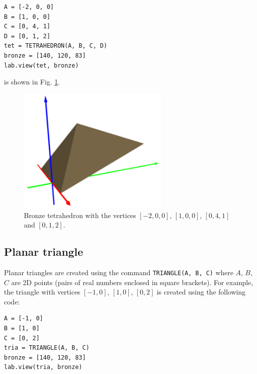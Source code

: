 \begin{bbox}
\begin{verbatim}
A = [-2, 0, 0] 
B = [1, 0, 0] 
C = [0, 4, 1] 
D = [0, 1, 2]
tet = TETRAHEDRON(A, B, C, D)
bronze = [140, 120, 83]
lab.view(tet, bronze)
\end{verbatim}
\end{bbox}
\vspace{6mm}

\noindent
is shown in Fig. \ref{fig:chull}.

\begin{figure}[!ht]
\begin{center}
\includegraphics[width=0.65\textwidth]{img/chull1.png}
\end{center}
\vspace{-2mm}
\caption{Bronze tetrahedron with the vertices $[-2, 0, 0]$, $[1, 0, 0]$, $[0, 4, 1]$ and $[0, 1, 2]$.}
\label{fig:chull}
\end{figure}
\noindent

\subsection{Planar triangle}

Planar triangles are created using the command {\tt TRIANGLE(A, B, C)} where 
$A$, $B$, $C$ are 2D points (pairs of real numbers enclosed in square brackets).
For example, the triangle with vertices $[-1, 0]$, $[1, 0]$, $[0, 2]$ is 
created using the following code:\\

\begin{bbox}
\begin{verbatim}
A = [-1, 0] 
B = [1, 0] 
C = [0, 2] 
tria = TRIANGLE(A, B, C)
bronze = [140, 120, 83]
lab.view(tria, bronze)
\end{verbatim}
\end{bbox}
\vspace{6mm}

